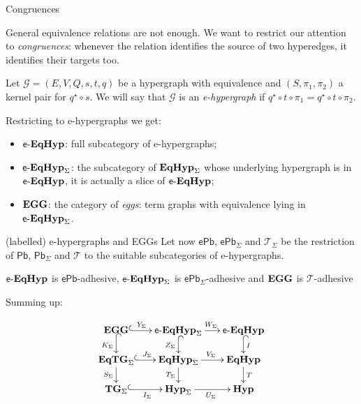 \documentclass[aspectratio=169]{beamer}
\newcommand{\catname}[1]{\textbf{\textup{#1}}}
\newcommand{\tg}[0]{\catname{TG}_{\Sigma}}
\newcommand{\eg}{\catname{EGG}}
\newcommand{\egg}{\mathsf{e}\text{-}\catname{EqHyp}}
\newcommand{\hyp}{\catname{Hyp}}
\newcommand{\EqHyp}{\catname{EqHyp}} %
\newcommand{\EqTG}{\catname{EqTG}}
\newcommand{\pbc}{\mathsf{Pb}}
\newcommand{\pbe}{\mathsf{ePb}}
\begin{document}
\begin{frame}{Congruences}

General equivalence relations are not enough. We want to restrict our attention to \emph{congruences}: whenever the relation identifies the source of two hyperedges, it identifies their targets too. 
	
\pause 

\begin{definition}\justifying 
	Let $\mathcal{G} = (E, V, Q, s, t, q)$ be a hypergraph with equivalence and $(S, \pi_1, \pi_2)$ a kernel pair for $q^\star \circ s$.
We will say that $\mathcal{G}$ is an \emph{e-hypergraph} if $q^\star \circ t \circ \pi_1 = q^\star \circ t \circ \pi_2$.
\end{definition}	
	
	\pause 
	Restricting to e-hypergraphs we get: \pause 
\begin{itemize}\justifying
	\item $\egg$: full subcategory of e-hypergraphs; \pause 
	\item $\egg_\Sigma$: the subcategory of $\EqHyp_\Sigma$ whose underlying hypergraph is in $\egg$, it is actually a slice of $\egg$; \pause 
	\item $\eg$: the category of \emph{eggs}: term graphs with equivalence lying in $\egg_\Sigma$.
\end{itemize}	
	
\end{frame}



\begin{frame}{(labelled) e-hypergraphs and EGGs }
	Let now $\pbe$, $\pbe_\Sigma$ and $\mathcal{T}_\Sigma$ be the restriction of $\pbc$, $\pbc_\Sigma$ and $\mathcal{T}$ to the suitable subcategories of e-hypergraphs. 
	
	\pause 
	\begin{theorem}
	$\egg$ is $\pbe$-adhesive, $\egg_\Sigma$ is $\pbe_\Sigma$-adhesive and $\eg$ is $\mathcal{T}$-adhesive
	\end{theorem}
\end{frame}

\begin{frame}
	
	Summing up:
	
	\[\xymatrix@R=15pt@C=15pt{ \eg \ar@{^{(}->}[r]^-{Y_\Sigma} \ar@{^{(}->}[d]_{K_\Sigma} & \egg_\Sigma \ar@{^{(}->}[d]_{ Z_\Sigma} \ar[r]^{W_\Sigma}& \egg \ar@{^{(}->}[d]^{I}\\ \EqTG_{\Sigma} \ar@{^{(}->}[r]^{J_\Sigma}\ar[d]_{S_\Sigma}& \EqHyp_\Sigma \ar[r]^{V_\Sigma} \ar[d]_{T_\Sigma}& \EqHyp \ar[d]^{T}\\ \tg \ar@{^{(}->}[r]_{I_\Sigma}& \hyp_{\Sigma} \ar[r]_{U_\Sigma}  &\hyp}\]
	
	
\end{frame}
\end{document}
